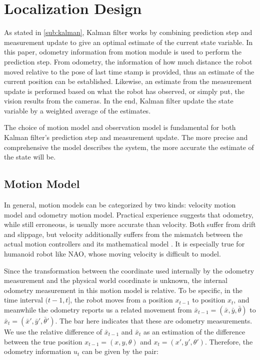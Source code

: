 \chapter{Localization Design\label{cha:chapter4}}


As stated in \autoref{sub:kalman}, Kalman filter works by combining prediction step and measurement update to give an optimal estimate of the current state variable. In this paper, odometry information from motion module is used to perform the prediction step. From odometry, the information of how much distance the robot moved relative to the pose of last time stamp is provided, thus an estimate of the current position can be established. Likewise, an estimate from the measurement update is performed based on what the robot has observed, or simply put, the vision results from the cameras. In the end, Kalman filter update the state variable by a weighted average of the estimates.

The choice of motion model and observation model is fundamental for both Kalman filter's prediction step and measurement update. The more precise and comprehensive the model describes the system, the more accurate the estimate of the state will be. 

\section{Motion Model}\label{sec:Motion Model}
In general, motion models can be categorized by two kinds: velocity motion model and odometry motion model. Practical experience suggests that odometry, while still erroneous, is usually more accurate than velocity. Both suffer from drift and slippage, but velocity additionally suffers from the mismatch between the actual motion controllers and its mathematical model \cite{thrun2005probabilistic}. It is especially true for humanoid robot like NAO, whose moving velocity is difficult to model. 

Since the transformation between the coordinate used internally by the odometry measurement and the physical world coordinate is unknown, the internal odometry measurement in this motion model is relative. 
To be specific, in the time interval $(t-1, t]$, the robot moves from a position $x_{t-1}$ to position $x_t$, and meanwhile the odometry reports us a related movement from $\bar{x}_{t-1} = (\bar{x}, \bar{y}, \bar{\theta})$ to $\bar{x}_{t} = (\bar{x}', \bar{y}', \bar{\theta}')$. The bar here indicates that these are odometry measurements. We use the relative difference of $\bar{x}_{t-1}$ and $\bar{x}_{t}$ as an estimation of the difference between the true position $x_{t-1} = (x, y, \theta)$ and $x_t = (x', y', \theta')$. Therefore, the odometry information $u_t$ can be given by the pair:

